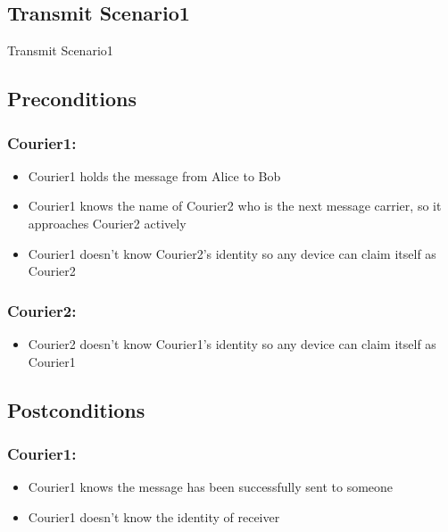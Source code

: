 \documentclass{article}
\begin{document}
\subsection*{Transmit Scenario1}
\begin{msc}{Transmit Scenario1}
\setlength{\instdist}{3\instdist}
\setlength{\envinstdist}{2\envinstdist}
\setlength{\levelheight}{1.5\levelheight}

\nextlevel
{}
\nextlevel[2]
\nextlevel
{}
\end{msc}


\subsection*{Preconditions}
\subsubsection*{Courier1:}
\begin{itemize}
\item Courier1 holds the message from Alice to Bob
\item Courier1 knows the name of Courier2 who is the next message carrier, so it approaches Courier2 actively
\item Courier1 doesn't know Courier2's identity so any device can claim itself as Courier2
\end{itemize}

\subsubsection*{Courier2:}
\begin{itemize}
\item Courier2 doesn't know Courier1's identity so any device can claim itself as Courier1
\end{itemize}

\subsection*{Postconditions}
\subsubsection*{Courier1:}
\begin{itemize}
\item Courier1 knows the message has been successfully sent to someone
\item Courier1 doesn't know the identity of receiver
\end{itemize}
\end{document}
